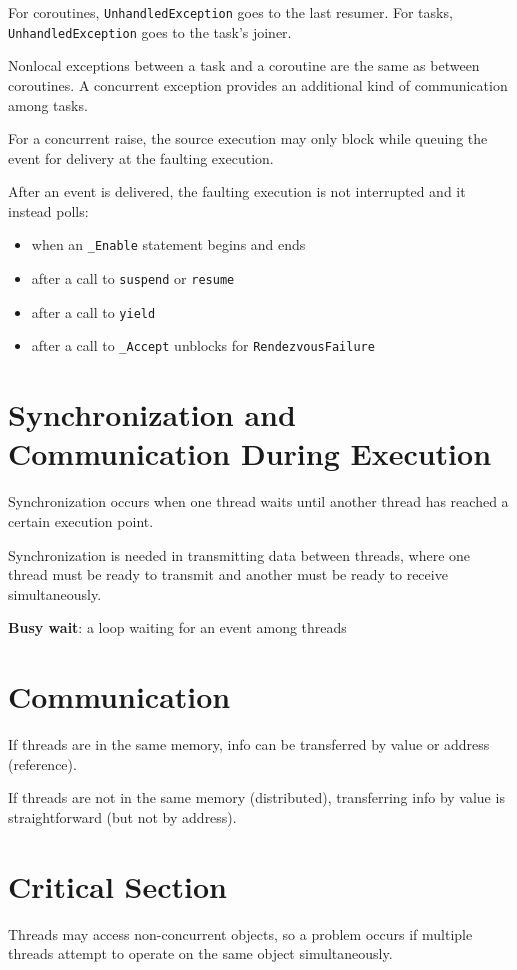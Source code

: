 \documentclass[11pt]{article}
\begin{document}
For coroutines, \texttt{UnhandledException} goes to the last resumer.
For tasks, \texttt{UnhandledException} goes to the task's joiner.

Nonlocal exceptions between a task and a coroutine are the same as between coroutines.
A concurrent exception provides an additional kind of communication among tasks.

For a concurrent raise, the source execution may only block while queuing the event for delivery at
the faulting execution.

After an event is delivered, the faulting execution is not interrupted and it instead polls:
\begin{itemize}
\item when an \texttt{\_Enable} statement begins and ends
\item after a call to \texttt{suspend} or \texttt{resume}
\item after a call to \texttt{yield}
\item after a call to \texttt{\_Accept} unblocks for \texttt{RendezvousFailure}
\end{itemize}
\section{Synchronization and Communication During Execution}
\label{sec:org939fbd1}
Synchronization occurs when one thread waits until another thread has reached a certain execution point.

Synchronization is needed in transmitting data between threads, where one thread must be ready
to transmit and another must be ready to receive simultaneously.

\textbf{Busy wait}: a loop waiting for an event among threads
\section{Communication}
\label{sec:org3a62f20}
If threads are in the same memory, info can be transferred by value or address (reference).

If threads are not in the same memory (distributed), transferring info by value is straightforward
(but not by address).
\section{Critical Section}
\label{sec:org6c1e284}
Threads may access non-concurrent objects, so a problem occurs if multiple threads attempt to operate
on the same object simultaneously.
\end{document}

